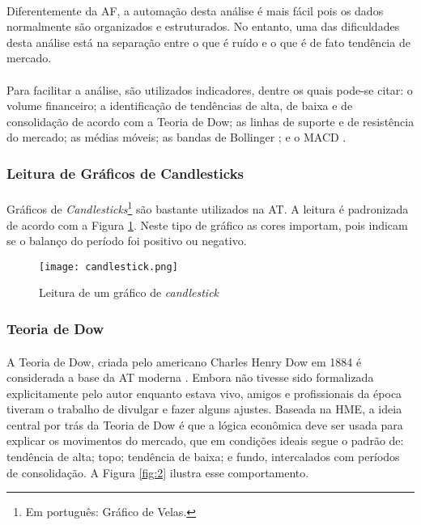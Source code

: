 \paragraph{} Diferentemente da AF, a automação desta análise é mais fácil pois os dados normalmente são organizados e estruturados. No entanto, uma das dificuldades desta análise está na separação entre o que é ruído e o que é de fato tendência de mercado.

\paragraph{} Para facilitar a análise, são utilizados indicadores, dentre os quais pode-se citar: o volume financeiro; a identificação de tendências de alta, de baixa e de consolidação de acordo com a Teoria de Dow; as linhas de suporte e de resistência do mercado; as médias móveis; as bandas de Bollinger \cite{bollinger2002bollinger}; e o MACD \cite{appel2007understanding}.


\FloatBarrier
\subsubsection*{Leitura de Gráficos de Candlesticks}

\paragraph{} Gráficos de \textit{Candlesticks}\footnote{Em português: Gráfico de Velas.} são bastante utilizados na AT. A leitura é padronizada de acordo com a Figura \ref{fig:1}. Neste tipo de gráfico as cores importam, pois indicam se o balanço do período foi positivo ou negativo.

\begin{figure}[h]
    \texttt{[image: candlestick.png]}
    \centering
    \caption{Leitura de um gráfico de \textit{candlestick} \cite{candlestick}}
    \label{fig:1}
\end{figure}


\FloatBarrier
\subsubsection*{Teoria de Dow}

\paragraph{} A Teoria de Dow, criada pelo americano Charles Henry Dow em 1884 é considerada a base da AT moderna \cite{kirkpatrick2010technical}. Embora não tivesse sido formalizada explicitamente pelo autor enquanto estava vivo, amigos e profissionais da época tiveram o trabalho de divulgar e fazer alguns ajustes. Baseada na HME, a ideia central por trás da Teoria de Dow é que a lógica econômica deve ser usada para explicar os movimentos do mercado, que em condições ideais segue o padrão de: tendência de alta; topo; tendência de baixa; e fundo, intercalados com períodos de consolidação. A Figura \ref{fig:2} ilustra esse comportamento.

